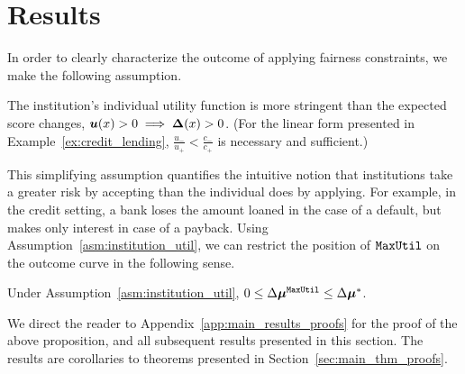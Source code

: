 
\section{Results}\label{sec:results}

In order to clearly characterize the outcome of applying fairness constraints, we make the following assumption.

\begin{asm}\label{asm:institution_util}
	The institution's individual utility function is more stringent than the expected score changes, $\boldsymbol{u}(x)> 0 \implies \boldsymbol{\Delta}(x)>0$. (For the linear form presented in Example~\ref{ex:credit_lending},  $\frac{u_-}{u_+} < \frac{c_-}{c_+}$ is necessary and sufficient.)
\end{asm}

This simplifying assumption quantifies the intuitive notion that institutions take a greater risk by accepting than the individual does by applying. For example, in the credit setting, a bank loses the amount loaned in the case of a default, but makes only interest in case of a payback. Using Assumption~\ref{asm:institution_util}, we can restrict the position of $\mathtt{MaxUtil}$ on the outcome curve in the following sense.

\begin{prop}\label{prop:mp_noharm}
	Under Assumption~\ref{asm:institution_util}, $ 0\leq \Delta\boldsymbol{\mu}^{\mathtt{MaxUtil}} \leq \Delta\boldsymbol{\mu}^*$.
\end{prop}
We direct the reader to Appendix~\ref{app:main_results_proofs} for the proof of the above proposition, and all subsequent results presented in this section. The results are corollaries to theorems presented in Section~\ref{sec:main_thm_proofs}.





